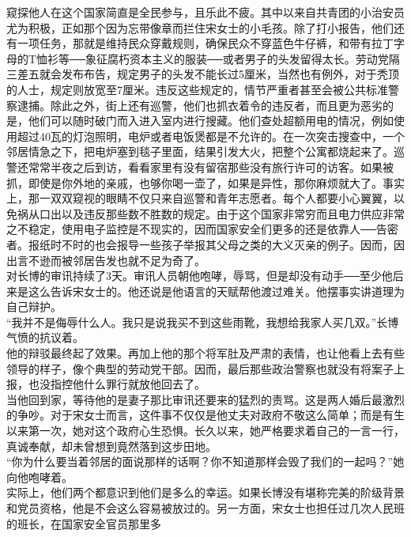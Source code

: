 窥探他人在这个国家简直是全民参与，且乐此不疲。其中以来自共青团的小治安员尤为积极，正如那个因为忘带像章而拦住宋女士的小毛孩。除了打小报告，他们还有一项任务，那就是维持民众穿戴规则，确保民众不穿蓝色牛仔裤，和带有拉丁字母的T恤衫等──象征腐朽资本主义的服装──或者男子的头发留得太长。劳动党隔三差五就会发布布告，规定男子的头发不能长过5厘米，当然也有例外，对于秃顶的人士，规定则放宽至7厘米。违反这些规定的，情节严重者甚至会被公共标准警察逮捕。除此之外，街上还有巡警，他们也抓衣着令的违反者，而且更为恶劣的是，他们可以随时破门而入进入室内进行搜藏。他们查处超额用电的情况，例如使用超过40瓦的灯泡照明，电炉或者电饭煲都是不允许的。在一次突击搜查中，一个邻居情急之下，把电炉塞到毯子里面，结果引发大火，把整个公寓都烧起来了。巡警还常常半夜之后到访，看看家里有没有留宿那些没有旅行许可的访客。如果被抓，即使是你外地的亲戚，也够你喝一壶了，如果是异性，那你麻烦就大了。事实上，那一双双窥视的眼睛不仅只来自巡警和青年志愿者。每个人都要小心翼翼，以免祸从口出以及违反那些数不胜数的规定。由于这个国家非常穷而且电力供应非常之不稳定，使用电子监控是不现实的，因而国家安全们更多的还是依靠人──告密者。报纸时不时的也会报导一些孩子举报其父母之类的大义灭亲的例子。因而，因出言不逊而被邻居告发也就不足为奇了。\\

对长博的审讯持续了3天。审讯人员朝他咆哮，辱骂，但是却没有动手──至少他后来是这么告诉宋女士的。他还说是他语言的天赋帮他渡过难关。他摆事实讲道理为自己辩护。\\

“我并不是侮辱什么人。我只是说我买不到这些雨靴，我想给我家人买几双。”长博气愤的抗议着。\\

他的辩驳最终起了效果。再加上他的那个将军肚及严肃的表情，也让他看上去有些领导的样子，像个典型的劳动党干部。因而，最后那些政治警察也就没有将案子上报，也没指控他什么罪行就放他回去了。\\

当他回到家，等待他的是妻子那比审讯还要来的猛烈的责骂。这是两人婚后最激烈的争吵。对于宋女士而言，这件事不仅仅是他丈夫对政府不敬这么简单；而是有生以来第一次，她对这个政府心生恐惧。长久以来，她严格要求着自己的一言一行，真诚奉献，却未曾想到竟然落到这步田地。\\

“你为什么要当着邻居的面说那样的话啊？你不知道那样会毁了我们的一起吗？”她向他咆哮着。\\

实际上，他们两个都意识到他们是多么的幸运。如果长博没有堪称完美的阶级背景和党员资格，他是不会这么容易被放过的。另一方面，宋女士也担任过几次人民班的班长，在国家安全官员那里多\\

